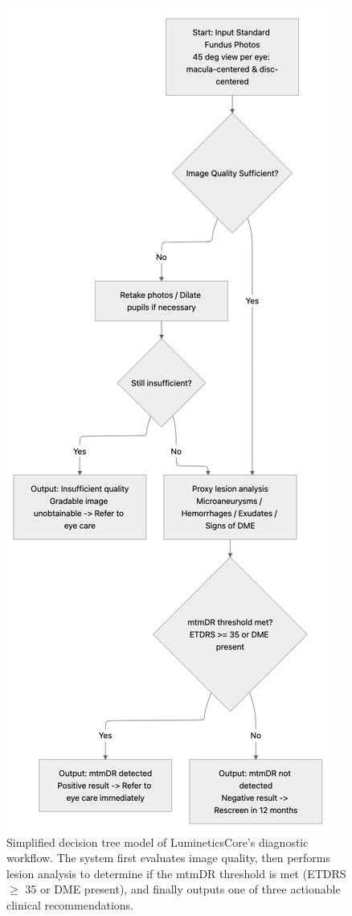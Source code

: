 \documentclass[sigplan,screen]{acmart}
\begin{document}
\begin{figure}[htbp]
    \centering
\includegraphics[width=\columnwidth]{Figure2.jpg}
\caption{Simplified decision tree model of LumineticsCore's diagnostic workflow. The system first evaluates image quality, then performs lesion analysis to determine if the mtmDR threshold is met (ETDRS $\geq$ 35 or DME present), and finally outputs one of three actionable clinical recommendations.}
\label{fig:decision-tree}
\end{figure}
\end{document}

